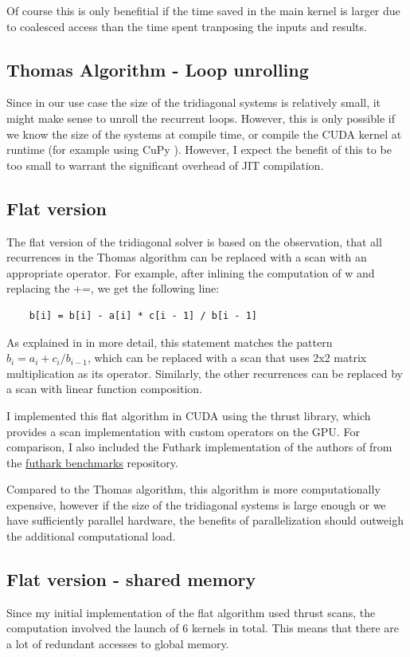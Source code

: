 \documentclass[a4paper,oneside]{memoir}
\begin{document}
Of course this is only benefitial if the time saved in the main kernel is larger due to coalesced access than the time spent tranposing the inputs and results.

\subsection{Thomas Algorithm - Loop unrolling}
Since in our use case the size of the tridiagonal systems is relatively small, it might make sense to unroll the recurrent loops. However, this is only possible if we know the size of the systems at compile time, or compile the CUDA kernel at runtime (for example using CuPy \cite{cupylearningsys2017}). 
However, I expect the benefit of this to be too small to warrant the significant overhead of JIT compilation.

\subsection{Flat version}
The flat version of the tridiagonal solver is based on the observation, 
that all recurrences in the Thomas algorithm can be replaced with a scan with an appropriate operator. 
For example, after inlining the computation of w and replacing the +=, we get the following line: 
\begin{verbatim}
    b[i] = b[i] - a[i] * c[i - 1] / b[i - 1] 
\end{verbatim}
As explained in \cite{andreetta2016finpar} in more detail, this statement matches the pattern $b_i = a_i + c_i / b_{i-1}$, which can be replaced with a scan that uses 2x2 matrix multiplication as its operator.
Similarly, the other recurrences can be replaced by a scan with linear function composition.

I implemented this flat algorithm in CUDA using the thrust library, which provides a scan implementation with custom operators on the GPU.
For comparison, I also included the Futhark implementation of the authors of \cite{andreetta2016finpar} from the 
\href{https://github.com/diku-dk/futhark-benchmarks/blob/bf5112d0841866dc7370586f2e2a7b48467d2d97/finpar/LocVolCalib.fut}{futhark benchmarks}
repository.

Compared to the Thomas algorithm, this algorithm is more computationally expensive, however if the size of the tridiagonal systems is large enough or we have sufficiently parallel hardware, the benefits of parallelization should outweigh the additional computational load.

\subsection{Flat version - shared memory}
Since my initial implementation of the flat algorithm used thrust scans, the computation involved the launch of 6 kernels in total. This means that there are a lot of redundant accesses to global memory. 
\end{document}
